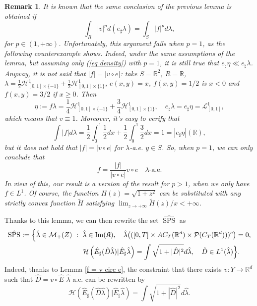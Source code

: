 \documentclass[10pt,leqno]{amsart}
\numberwithin{equation}{section}
\newtheorem{oss}[teorema]{Remark}
\newcommand{\R}{\mathbb{R}}
\newcommand{\PP}{\mathcal{P}}
\begin{document}
\begin{oss}\label{remark density push-forward}
    It is known that the same conclusion of the previous lemma is obtained if 
    \begin{equation}\label{eq density}
        \int_R |v|^p d(e_\sharp \lambda) = \int_S |f|^p d\lambda,
    \end{equation}
    for $p\in(1,+\infty)$. Unfortunately, this argument fails when $p=1$, as the following counterexample shows.
    Indeed, under the same assumptions of the lemma, but assuming only (\ref{eq density}) with $p=1$, it is still true that $e_\sharp \eta\ll e_\sharp \lambda$. Anyway, it is not said that $|f|=|v\circ e|$: take $S=\R^2$, $R=\R$, $\lambda = \frac{1}{2}\mathcal{H}^1_{[0,1]\times \{-1\}} + \frac{1}{2}\mathcal{H}^1_{[0,1]\times \{1\}}$, $e(x,y) = x$, $f(x,y) = 1/2$ is $x<0$ and $f(x,y) = 3/2$ if $x\geq 0$. Then 
    \[\eta := f\lambda = \frac{1}{4}\mathcal{H}^1_{[0,1]\times \{-1\}} + \frac{3}{4}\mathcal{H}^1_{[0,1]\times \{1\}}, \quad e_\sharp \lambda = e_\sharp \eta = \mathcal{L}^1_{[0,1]},\]
    which means that $v \equiv 1$. Moreover, it's easy to verify that
    \[\int |f|d\lambda = \frac{1}{2}\int_0^1 \frac{1}{2}dx + \frac{1}{2}\int_0^1\frac{3}{2} dx = 1 = |e_\sharp \eta|(\R),\]
    but it does not hold that $|f| = |v\circ e|$ for $\lambda$-a.e. $y\in S$.
    So, when $p=1$, we can only conclude that 
    \[f = \frac{|f|}{|v\circ e|} v\circ e \quad \lambda\text{-a.e.}\]
    In view of this, our result is a version of the result for $p>1$, when we only have $f\in L^1$. Of course, the function $H(z) = \sqrt{1+z^2}$ can be substituted with any strictly convex function $\tilde{H}$ satisfying $\operatorname{lim}_{z\to+\infty}\tilde{H}(z)/x <+\infty$.
\end{oss}

Thanks to this lemma, we can then rewrite the set $\hat{\operatorname{SPS}}$ as 
\begin{equation}
\begin{aligned}
    & \hat{\operatorname{SPS}} :=\Big\{ \hat{\lambda}\in \mathcal{M}_+(Z) \ : \ \hat{\lambda} \in \operatorname{Im}(\mathfrak{K}),\quad
        \hat{\lambda} \big(([0,T] \times AC_T(\R^d) \times \PP(C_T(\R^d)))^c \big) =0, 
        \\
        &
        \hspace{3.8cm}
        \mathcal{H}\left( \hat{E}_\sharp (\hat{D}\hat{\lambda}) | \hat{E}_\sharp  \hat{\lambda} \right) = \int\sqrt{1+|\hat{D}|^2}d\hat{\lambda} , \quad  \hat{D}\in L^1(\hat{\lambda})
        \Big\}.
\end{aligned}
\end{equation}
Indeed, thanks to Lemma \ref{f = v circ e}, the constraint that there exists $v:Y \to \R^d$ such that $\hat{D} = v\circ \hat{E}$ $\hat{\lambda}$-a.e. can be rewritten by 
\begin{equation}\label{eq: meas cond using H}
\mathcal{H}\left( \hat{E}_\sharp (\hat{D}\hat{\lambda}) | \hat{E}_\sharp  \hat{\lambda} \right) = \int\sqrt{1+|\hat{D}|^2}d\hat{\lambda}.
\end{equation}
\end{document}
